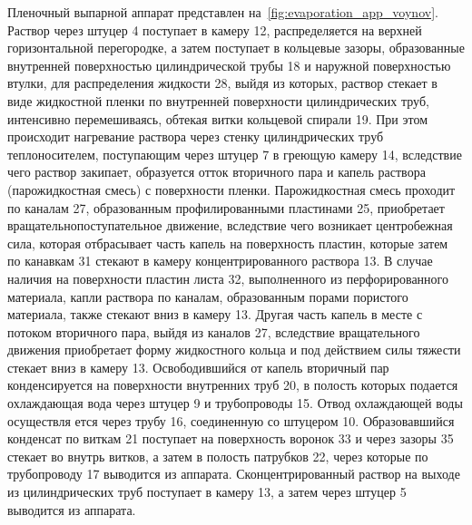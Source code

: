 Пленочный выпарной аппарат \cite{Voynov.Plenochniy.2006} представлен на~\cref{fig:evaporation_app_voynov}.
Раствор через штуцер 4 поступает в камеру 12, распределяется на верхней горизонтальной перегородке, а затем поступает в кольцевые зазоры, образованные внутренней поверхностью цилиндрической трубы 18 и наружной поверхностью втулки, для распределения жидкости 28, выйдя из которых, раствор стекает в виде жидкостной пленки по внутренней поверхности цилиндрических труб, интенсивно перемешиваясь, обтекая витки кольцевой спирали 19.
При этом происходит нагревание раствора через стенку цилиндрических труб теплоносителем, поступающим через штуцер 7 в греющую камеру 14, вследствие чего раствор закипает, образуется отток вторичного пара и капель раствора (парожидкостная смесь) с поверхности пленки.
Парожидкостная смесь проходит по каналам 27, образованным профилированными пластинами 25, приобретает вращательнопоступательное движение, вследствие чего возникает центробежная сила, которая отбрасывает часть капель на поверхность пластин, которые затем по канавкам 31 стекают в камеру концентрированного раствора 13.
В случае наличия на поверхности пластин листа 32, выполненного из перфорированного материала, капли раствора по каналам, образованным порами пористого материала, также стекают вниз в камеру 13.
Другая часть капель в месте с потоком вторичного пара, выйдя из каналов 27, вследствие вращательного движения приобретает форму жидкостного кольца и под действием силы тяжести стекает вниз в камеру 13.
Освободившийся от капель вторичный пар конденсируется на поверхности внутренних труб 20, в полость которых подается охлаждающая вода через штуцер 9 и трубопроводы 15.
Отвод охлаждающей воды осуществля ется через трубу 16, соединенную со штуцером 10.
Образовавшийся конденсат по виткам 21 поступает на поверхность воронок 33 и через зазоры 35 стекает во внутрь витков, а затем в полость патрубков 22, через которые по трубопроводу 17 выводится из аппарата.
Сконцентрированный раствор на выходе из цилиндрических труб поступает в камеру 13, а затем через штуцер 5 выводится из аппарата.


